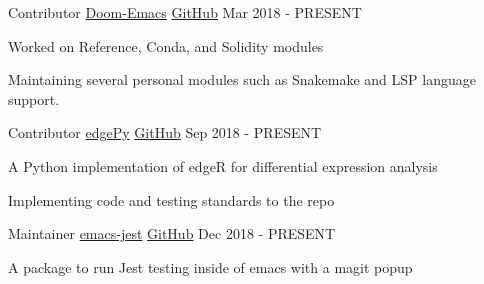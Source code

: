

\begin{cventries}

  \cventry
    {Contributor} %
    {\href{https://github.com/hlissner/doom-emacs}{Doom-Emacs}} %
    {\href{https://github.com/hlissner/doom-emacs}{GitHub}} %
    {Mar 2018 - PRESENT} %
    {
      \begin{cvitems} %
        \item {Worked on Reference, Conda, and Solidity modules}
        \item {Maintaining several personal modules such as Snakemake and LSP language support.}
      \end{cvitems}
    }

  \cventry
    {Contributor} %
    {\href{https://github.com/r-bioinformatics/edgePy}{edgePy}} %
    {\href{https://github.com/r-bioinformatics/edgePy}{GitHub}} %
    {Sep 2018 - PRESENT} %
    {
      \begin{cvitems} %
        \item {A Python implementation of edgeR for differential expression analysis}
        \item {Implementing code and testing standards to the repo}
      \end{cvitems}
    }

  \cventry
    {Maintainer} %
    {\href{https://github.com/emiller88/emacs-jest}{emacs-jest}} %
    {\href{https://github.com/emiller88/emacs-jest}{GitHub}} %
    {Dec 2018 - PRESENT} %
    {
      \begin{cvitems} %
        \item {A package to run Jest testing inside of emacs with a magit popup}
      \end{cvitems}
    }

\end{cventries}
